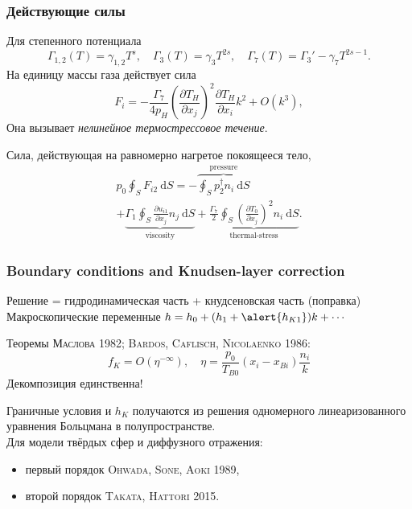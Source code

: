 \documentclass[mathserif]{beamer} %
\newcommand{\dd}{\:\mathrm{d}}
\newcommand{\pder}[2][]{\frac{\partial#1}{\partial#2}}
\newcommand{\OO}[1]{O(#1)}
\newcommand{\Cite}[2][]{\alert{\textsc{#2 #1}}}
\begin{document}
\begin{frame}
    \frametitle{Действующие силы}
    Для степенного потенциала
    \[ \Gamma_{1,2}(T) = \gamma_{1,2}T^s, \quad \Gamma_3(T) = \gamma_3T^{2s},
        \quad \Gamma_7(T) = \Gamma_3' - \gamma_7T^{2s-1}. \]
    На единицу массы газа действует сила
    \begin{equation}\label{eq:gamma7_force}
        F_i = -\frac{\Gamma_7}{4p_H} \left(\pder[T_H]{x_j}\right)^2 \pder[T_H]{x_i} k^2 + \OO{k^3},
    \end{equation}
    Она вызывает \emph{нелинейное термострессовое течение}.
    \vspace{10pt}\pause

    Сила, действующая на равномерно нагретое покоящееся тело,
    \begin{multline}\label{eq:force:terms}
        p_0 \oint_S F_{i2} \dd{S} =
            - \overbrace{ \oint_S p_2^\dag n_i \dd{S} }^\text{pressure} \\
            + \underbrace{ \Gamma_1\oint_S \pder[u_{i1}]{x_j} n_j \dd{S} }_\text{viscosity}
            + \underbrace{ \frac{\Gamma_7}{2} \oint_S \left(\pder[T_0]{x_j}\right)^2 n_i \dd{S} }_\text{thermal-stress}.
    \end{multline}
\end{frame}

\begin{frame}
    \frametitle{Boundary conditions and Knudsen-layer correction}
    Решение = гидродинамическая часть + кнудсеновская часть (поправка) \\
    Макроскопические переменные \(h = h_0 + (h_1 + \alert{h_{K1}})k + \cdots\)

    Теоремы {\footnotesize \Cite[1982]{Маслова}; \Cite[1986]{Bardos, Caflisch, Nicolaenko}}:
    \begin{equation}
        f_K = \OO{\eta^{-\infty}}, \quad \eta = \frac{p_0}{T_{B0}}(x_i-x_{Bi})\frac{n_i}k
    \end{equation}
    Декомпозиция единственна!
    \pause

    Граничные условия и \(h_K\) получаются из решения одномерного линеаризованного уравнения
    Больцмана в полупространстве.\\
    Для модели твёрдых сфер и диффузного отражения:
    \begin{itemize}
        \item первый порядок \Cite[1989]{Ohwada, Sone, Aoki},
        \item второй порядок \Cite[2015]{Takata, Hattori}.
    \end{itemize}
\end{frame}
\end{document}
